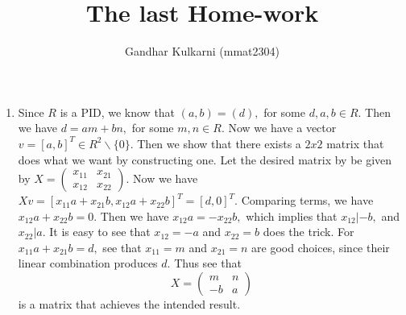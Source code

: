 \documentclass{article}
\title{The last Home-work} %
\author{Gandhar Kulkarni (mmat2304)} %
\date{} %
\begin{document}
\maketitle %


\section{} %
\begin{enumerate}
	\item Since $R$ is a PID, we know that $(a,b)=(d),$ for some $d,a,b \in R.$ Then we have $d=am+bn,$ for some $m,n \in R.$ Now we have a vector 
	$v=[a,b]^T \in R^2 \backslash \{0\}.$ Then we show that there exists a $2x2$ matrix that does what we want by constructing one. Let the desired matrix 
	by be given by $X= \begin{pmatrix}
	x_{11}&x_{21}\\
	x_{12}&x_{22} 	
	\end{pmatrix}.$ Now we have $Xv= [x_{11}a + x_{21}b, x_{12}a+x_{22}b]^T=[d,0]^T.$ Comparing terms, we have $x_{12}a+x_{22}b=0.$ Then we have 
	$x_{12}a=-x_{22}b,$ which implies that $ x_{12}| -b,$ and $x_{22}|a.$ It is easy to see that $x_{12}=-a$ and $x_{22}=b$ does the trick. For $x_{11}a + 
	x_{21}b=d,$ see that $x_{11}=m$ and $x_{21}=n$ are good choices, since their linear combination produces $d.$ Thus see that $$X=\begin{pmatrix}
	m&n\\
	-b&a
\end{pmatrix} $$ is a matrix that achieves the intended result.
\end{enumerate}
 
\section{} %
\end{document}
